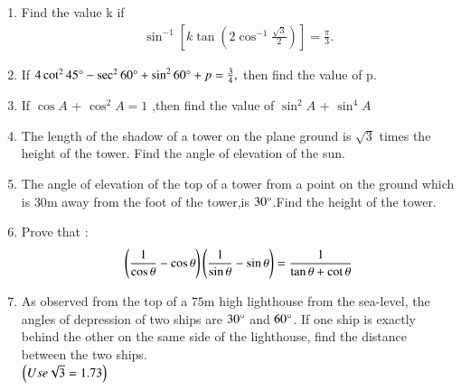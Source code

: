 \begin{enumerate}
\hfill{}\item Find the value k if 
\\ 
	\begin {align}
	\sin^{-1} \left[k \tan \left( 2\cos^{-1} \frac {\sqrt{3}}{2}\right)\right]= \frac{\pi}{3}.
\end {align}
\hfill{}

\item If $4 \cot^{2}45\degree-\sec^{2}60\degree+\sin^{2}60\degree+p=\frac{3}{4},$ then find the value of p.

\hfill{}\item If $\cos A$ + $\cos^{2}A = 1$ ,then find the value of $\sin^{2}A$ + $\sin^{4}A$

\hfill{}\item The length of the shadow of a tower on the plane ground is $ \sqrt3 $ times the height of the tower. Find the angle of elevation of the sun.

\hfill{}\item The angle of elevation of the top of a tower from a point on the ground which is $30 \mathrm{m}$ away from the foot of the tower,is $30\degree$.Find the height of the tower.

\hfill{}\item Prove that :
\begin{align}
	\left(\frac{1}{\cos\theta}-\cos\theta\right) \left(\frac{1}{\sin\theta}-\sin\theta\right) = \frac{1}{\tan\theta + \cot\theta}
\end{align}

\hfill{}\item As observed from the top of a $75 \mathrm{m}$ high lighthouse from the sea-level, the angles of depression of two ships are $30\degree$ and $60\degree$. If one ship is exactly behind the other on the same side of the lighthouse, find the distance between the two ships.\\
	$\left(Use \sqrt{3} = 1.73\right)$


\end{enumerate}
